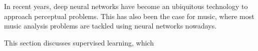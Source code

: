 

In recent years, deep neural networks have become an
ubiquitous technology to approach perceptual problems. This
has also been the case for music, where most music analysis
problems are tackled using neural networks nowadays.

This section discusses supervised learning, which
